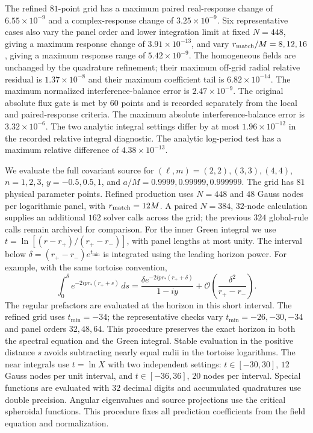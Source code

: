 \documentclass[aps,prd,twocolumn,10pt,nofootinbib,superscriptaddress,floatfix]{revtex4-2}
\begin{document}
The refined $81$-point grid has a maximum paired real-response change of
$6.55\times10^{-9}$ and a complex-response change of $3.25\times10^{-9}$.
Six representative cases also vary the panel order and lower integration
limit at fixed $N=448$, giving a maximum response change of
$3.91\times10^{-13}$, and vary $r_{\rm match}/M=8,12,16$, giving a
maximum response range of $5.42\times10^{-9}$.
The homogeneous fields are unchanged by the quadrature refinement;
their maximum off-grid radial relative residual is $1.37\times10^{-8}$
and their maximum coefficient tail is $6.82\times10^{-14}$.
The maximum normalized interference-balance error is $2.47\times10^{-9}$.
The original absolute flux gate is met by $60$ points and is recorded
separately from the local and paired-response criteria.
The maximum absolute interference-balance error is $3.32\times10^{-6}$. The two analytic integral settings differ by at most $1.96\times10^{-12}$ in the recorded relative integral diagnostic. The analytic log-period test has a maximum relative difference of $4.38\times10^{-13}$.


We evaluate the full covariant source for $(\ell,m)=(2,2),(3,3),(4,4)$,
$n=1,2,3$, $y=-0.5,0.5,1$, and
$a/M=0.9999,0.99999,0.999999$.
The grid has $81$ physical parameter points.  Refined production uses
$N=448$ and $48$ Gauss nodes per logarithmic panel, with
$r_{\rm match}=12M$.  A paired $N=384$, $32$-node calculation supplies
an additional $162$ solver calls across the grid; the previous $324$
global-rule calls remain archived for comparison.
For the inner Green integral we use $t=\ln[(r-r_+)/(r_+-r_-)]$,
with panel lengths at most unity.  The interval below
$\delta=(r_+-r_-)e^{t_{\min}}$ is integrated using the leading horizon
power.  For example, with the same tortoise convention,
\begin{equation}
\int_0^\delta e^{-2ipr_*(r_++s)}\,ds
=\frac{\delta e^{-2ipr_*(r_++\delta)}}{1-iy}
+\mathcal O\!\left(\frac{\delta^2}{r_+-r_-}\right).
\label{eq:log-horizon-endpoint-integral}
\end{equation}
The regular prefactors are evaluated at the horizon in this short interval.
The refined grid uses $t_{\min}=-34$; the representative checks vary
$t_{\min}=-26,-30,-34$ and panel orders $32,48,64$.
This procedure preserves the exact horizon in both the spectral equation
and the Green integral.  Stable evaluation in the positive distance $s$
avoids subtracting nearly equal radii in the tortoise logarithms.
The near integrals use $t=\ln X$ with two independent settings:
$t\in[-30,30]$, $12$ Gauss nodes per unit interval, and
$t\in[-36,36]$, $20$ nodes per interval.  Special functions are evaluated
with $32$ decimal digits and accumulated quadratures use double precision.
Angular eigenvalues and source projections use the critical spheroidal
functions.  This procedure fixes all prediction coefficients from the
field equation and normalization.
\end{document}
